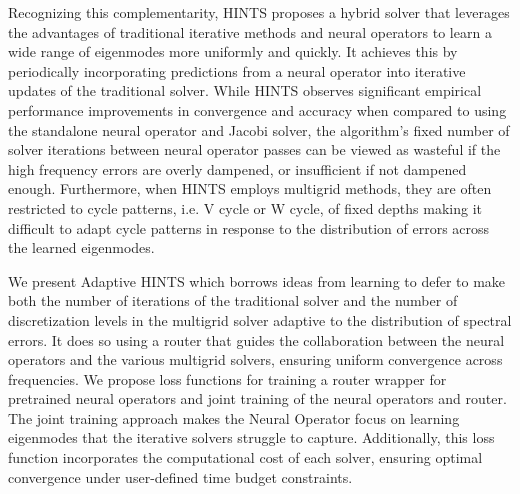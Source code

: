 \documentclass[12pt]{article}
\begin{document}
Recognizing this complementarity, HINTS \autocite{zhang2024blending} proposes a hybrid solver that leverages the advantages of traditional iterative methods and neural operators  to learn a wide range of eigenmodes more uniformly and quickly. It achieves this by periodically incorporating predictions from a neural operator into iterative updates of the traditional solver. While HINTS observes significant empirical performance improvements in convergence and accuracy when compared to using the standalone neural operator and Jacobi solver, the algorithm's fixed number of solver iterations between neural operator passes can be viewed as wasteful if the high frequency errors are overly dampened, or insufficient if not dampened enough. Furthermore, when HINTS employs multigrid methods, they are often restricted to cycle patterns, i.e. V cycle or W cycle, of fixed depths making it difficult to adapt cycle patterns in response to the distribution of errors across the learned eigenmodes.

We present Adaptive HINTS which borrows ideas from learning to defer to make both the number of iterations of the traditional solver and the number of discretization levels in the multigrid solver adaptive to the distribution of spectral errors. It does so using a router that guides the collaboration between the neural operators and the various multigrid solvers, ensuring uniform convergence across frequencies. We propose loss functions for training a router wrapper for pretrained neural operators and joint training of the neural operators and router. The joint training approach makes the Neural Operator focus on learning eigenmodes that the iterative solvers struggle to capture. Additionally, this loss function incorporates the computational cost of each solver, ensuring optimal convergence under user-defined time budget constraints.
\end{document}
